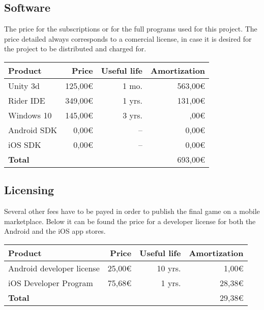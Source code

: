 \subsection{Software}

The price for the subscriptions or for the full programs used for this project. The price detailed always corresponds to a comercial license, in case it is desired for the project to be distributed and charged for.

\begin{center}
    \begin{tabular}{ | l | r | r | r | }
        \hline
        \textbf{Product} & \textbf{Price} &
        \textbf{Useful life} & \textbf{Amortization} \\ 
        \hline
        \hline
        Unity 3d & 125,00€ & 1 mo. & 563,00€ \\  
        Rider IDE & 349,00€ & 1 yrs. & 131,00€ \\
        Windows 10 & 145,00€ & 3 yrs. & \footnotemark
        0,00€\\ 
        Android SDK & 0,00€ & -- & 0,00€ \\ 
        iOS SDK & 0,00€ & -- & 0,00€ \\ 
        \hline
        \textbf{Total} & & & 693,00€ \\      
        \hline
    \end{tabular}
\end{center}

\subsection{Licensing}

Several other fees have to be payed in order to publish the final game on a mobile marketplace. Below it can be found the price for a developer license for both the Android and the iOS app stores.

\begin{center}
    \begin{tabular}{ | l | r | r | r | }
        \hline
        \textbf{Product} & \textbf{Price} &
        \textbf{Useful life} & \textbf{Amortization} \\ 
        \hline
        \hline
        Android developer license & 25,00€ & 10 yrs. & 1,00€ \\  
        iOS Developer Program & 75,68€ & 1 yrs. & 28,38€ \\
        \hline
        \textbf{Total} & & & 29,38€ \\      
        \hline
    \end{tabular}
\end{center}

